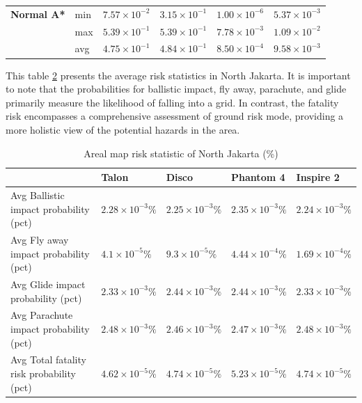 \documentclass[12pt]{report}
\begin{document}
\begin{table}[H]
\begin{tabular}{|l l l l l l |}
            \hline
            \textbf{Normal A*} & min & \(7.57 \times 10^{-2}\) & \(3.15 \times 10^{-1}\) & \(1.00 \times 10^{-6}\) & \(5.37 \times 10^{-3}\) \\
                               & max & \(5.39 \times 10^{-1}\) & \(5.39 \times 10^{-1}\) & \(7.78 \times 10^{-3}\) & \(1.09 \times 10^{-2}\) \\
                               & avg & \(4.75 \times 10^{-1}\) & \(4.84 \times 10^{-1}\) & \(8.50 \times 10^{-4}\) & \(9.58 \times 10^{-3}\) \\
            \hline
        \end{tabular}
        \captionsetup{justification=justified} %
        \label{tab:pathway-risk}
    \end{table}



    This table \ref{tab:total-map-risk} presents the average risk statistics in North Jakarta. It is
    important to note that the probabilities for ballistic impact, fly away, parachute, and glide primarily measure the
    likelihood of falling into a grid. In contrast, the fatality risk encompasses a comprehensive assessment of ground
    risk mode, providing a more holistic view of the potential hazards in the area.

    \begin{table}[H]
        \centering
        \caption{Areal map risk statistic of North Jakarta (\%)} %
        \begin{tabular}{|lllll|}
            \hline
            \textbf{} & \textbf{Talon} & \textbf{Disco} & \textbf{Phantom 4} & \textbf{Inspire 2} \\
            \hline
            {Avg Ballistic impact probability (pct)} & \(2.28 \times 10^{-3}\%\) & \(2.25 \times 10^{-3}\%\) & \(2.35 \times 10^{-3}\%\) & \(2.24 \times 10^{-3}\%\) \\
            {Avg Fly away impact probability (pct)} & \(4.1 \times 10^{-5}\%\) & \(9.3 \times 10^{-5}\%\) & \(4.44 \times 10^{-4}\%\) & \(1.69 \times 10^{-4}\%\) \\
            {Avg Glide impact probability (pct)} & \(2.33 \times 10^{-3}\%\) & \(2.44 \times 10^{-3}\%\) & \(2.44 \times 10^{-3}\%\) & \(2.33 \times 10^{-3}\%\) \\
            {Avg Parachute impact probability (pct)} & \(2.48 \times 10^{-3}\%\) & \(2.46 \times 10^{-3}\%\) & \(2.47 \times 10^{-3}\%\) & \(2.48 \times 10^{-3}\%\) \\
            {Avg Total fatality risk probability (pct)} & \(4.62 \times 10^{-5}\%\) & \(4.74 \times 10^{-5}\%\) & \(5.23 \times 10^{-5}\%\) & \(4.74 \times 10^{-5}\%\) \\
            \hline
        \end{tabular}
        \label{tab:total-map-risk}
    \end{table}
\end{document}
